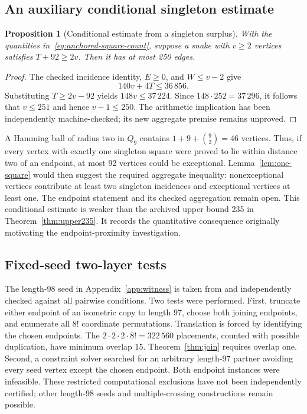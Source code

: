 \documentclass[11pt,a4paper]{article}
\newtheorem{proposition}[theorem]{Proposition}
\theoremstyle{definition}
\theoremstyle{remark}
\newcommand{\Q}{Q}
\begin{document}
\subsection{An auxiliary conditional singleton estimate}
\begin{proposition}[Conditional estimate from a singleton surplus]
With the quantities in~\eqref{eq:anchored-square-count}, suppose a snake with $v\ge2$ vertices satisfies $T+92\ge2v$. Then it has at most 250 edges.
\end{proposition}
\begin{proof}
The checked incidence identity, $E\ge0$, and $W\le v-2$ give
\[
140v+4T\le36\,856.
\]
Substituting $T\ge2v-92$ yields $148v\le37\,224$. Since $148\cdot252=37\,296$, it follows that $v\le251$ and hence $v-1\le250$. The arithmetic implication has been independently machine-checked; its new aggregate premise remains unproved.
\end{proof}
A Hamming ball of radius two in $\Q_9$ contains $1+9+\binom92=46$ vertices. Thus, if every vertex with exactly one singleton square were proved to lie within distance two of an endpoint, at most 92 vertices could be exceptional. Lemma~\ref{lem:one-square} would then suggest the required aggregate inequality: nonexceptional vertices contribute at least two singleton incidences and exceptional vertices at least one. The endpoint statement and its checked aggregation remain open. This conditional estimate is weaker than the archived upper bound 235 in Theorem~\ref{thm:upper235}. It records the quantitative consequence originally motivating the endpoint-proximity investigation.

\subsection{Fixed-seed two-layer tests}
The length-98 seed in Appendix~\ref{app:witness} is taken from \cite{records} and independently checked against all pairwise conditions. Two tests were performed. First, truncate either endpoint of an isometric copy to length 97, choose both joining endpoints, and enumerate all $8!$ coordinate permutations. Translation is forced by identifying the chosen endpoints. The $2\cdot2\cdot2\cdot8!=322\,560$ placements, counted with possible duplication, have minimum overlap 15. Theorem~\ref{thm:join} requires overlap one. Second, a constraint solver searched for an arbitrary length-97 partner avoiding every seed vertex except the chosen endpoint. Both endpoint instances were infeasible. These restricted computational exclusions have not been independently certified; other length-98 seeds and multiple-crossing constructions remain possible.
\end{document}
